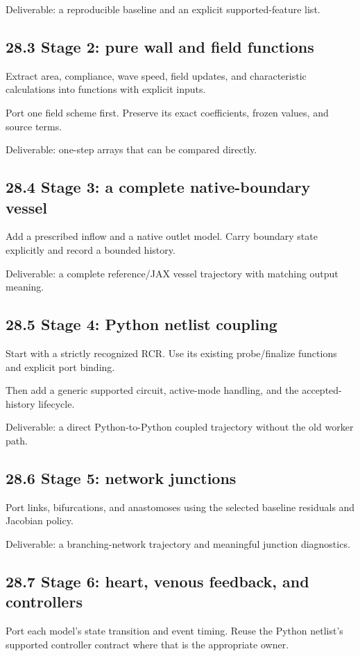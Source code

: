 \documentclass[11pt,a4paper]{article}
\begin{document}
Deliverable: a reproducible baseline and an explicit supported-feature list.

\subsection{28.3 Stage 2: pure wall and field functions}
Extract area, compliance, wave speed, field updates, and characteristic calculations into functions with explicit inputs.

Port one field scheme first. Preserve its exact coefficients, frozen values, and source terms.

Deliverable: one-step arrays that can be compared directly.

\subsection{28.4 Stage 3: a complete native-boundary vessel}
Add a prescribed inflow and a native outlet model. Carry boundary state explicitly and record a bounded history.

Deliverable: a complete reference/JAX vessel trajectory with matching output meaning.

\subsection{28.5 Stage 4: Python netlist coupling}
Start with a strictly recognized RCR. Use its existing probe/finalize functions and explicit port binding.

Then add a generic supported circuit, active-mode handling, and the accepted-history lifecycle.

Deliverable: a direct Python-to-Python coupled trajectory without the old worker path.

\subsection{28.6 Stage 5: network junctions}
Port links, bifurcations, and anastomoses using the selected baseline residuals and Jacobian policy.

Deliverable: a branching-network trajectory and meaningful junction diagnostics.

\subsection{28.7 Stage 6: heart, venous feedback, and controllers}
Port each model's state transition and event timing. Reuse the Python netlist's supported controller contract where that is the appropriate owner.
\end{document}
